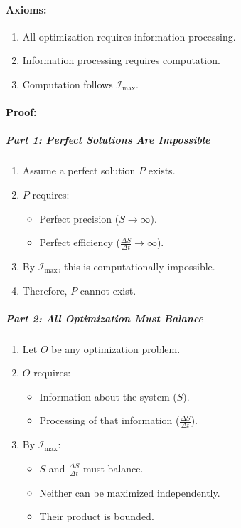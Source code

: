 \documentclass[12pt]{article}
\begin{document}
\paragraph{Axioms:}
\begin{enumerate}
    \item All optimization requires information processing.
    \item Information processing requires computation.
    \item Computation follows \(\mathcal{I}_{\text{max}}\).
\end{enumerate}

\paragraph{Proof:}

\subparagraph{Part 1: Perfect Solutions Are Impossible}
\begin{enumerate}
    \item Assume a perfect solution \(P\) exists.
    \item \(P\) requires:
    \begin{itemize}
        \item Perfect precision (\(S \to \infty\)).
        \item Perfect efficiency (\(\frac{\Delta S}{\Delta t} \to \infty\)).
    \end{itemize}
    \item By \(\mathcal{I}_{\text{max}}\), this is computationally impossible.
    \item Therefore, \(P\) cannot exist.
\end{enumerate}

\subparagraph{Part 2: All Optimization Must Balance}
\begin{enumerate}
    \item Let \(O\) be any optimization problem.
    \item \(O\) requires:
    \begin{itemize}
        \item Information about the system (\(S\)).
        \item Processing of that information (\(\frac{\Delta S}{\Delta t}\)).
    \end{itemize}
    \item By \(\mathcal{I}_{\text{max}}\):
    \begin{itemize}
        \item \(S\) and \(\frac{\Delta S}{\Delta t}\) must balance.
        \item Neither can be maximized independently.
        \item Their product is bounded.
    \end{itemize}
\end{enumerate}
\end{document}
